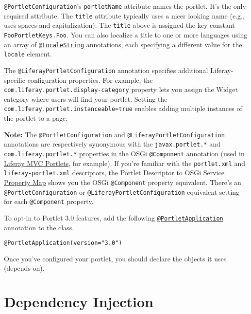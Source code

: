 \texttt{@PortletConfiguration}'s \texttt{portletName} attribute names
the portlet. It's the only required attribute. The \texttt{title}
attribute typically uses a nicer looking name (e.g., uses spaces and
capitalization). The \texttt{title} above is assigned the key constant
\texttt{FooPortletKeys.Foo}. You can also localize a title to one or
more languages using an array of
\href{https://docs.liferay.com/portlet-api/3.0/javadocs/javax/portlet/annotations/LocaleString.html}{\texttt{@LocaleString}}
annotations, each specifying a different value for the \texttt{locale}
element.

The \texttt{@LiferayPortletConfiguration} annotation specifies
additional Liferay-specific configuration properties. For example, the
\texttt{com.liferay.portlet.display-category} property lets you assign
the Widget category where users will find your portlet. Setting the
\texttt{com.liferay.portlet.instanceable=true} enables adding multiple
instances of the portlet to a page.

\noindent\hrulefill

\textbf{Note:} The \texttt{@PortletConfiguration} and
\texttt{@LiferayPortletConfiguration} annotations are respectively
synonymous with the \texttt{javax.portlet.*} and
\texttt{com.liferay.portlet.*} properties in the OSGi
\texttt{@Component} annotation (used in
\href{/docs/7-2/appdev/-/knowledge_base/a/liferay-mvc-portlet}{Liferay
MVC Portlets}, for example). If you're familiar with the
\texttt{portlet.xml} and \texttt{liferay-portlet.xml} descriptors, the
\href{/docs/7-2/reference/-/knowledge_base/r/portlet-descriptor-to-osgi-service-property-map}{Portlet
Descriptor to OSGi Service Property Map} shows you the OSGi
\texttt{@Component} property equivalent. There's an
\texttt{@PortletConfiguration} or \texttt{@LiferayPortletConfiguration}
equivalent setting for each \texttt{@Component} property.

\noindent\hrulefill

To opt-in to Portlet 3.0 features, add the following
\href{https://docs.liferay.com/portlet-api/3.0/javadocs/javax/portlet/annotations/PortletApplication.html}{\texttt{@PortletApplication}}
annotation to the class.

\begin{verbatim}
@PortletApplication(version="3.0")
\end{verbatim}

Once you've configured your portlet, you should declare the objects it
uses (depends on).

\section{Dependency Injection}\label{dependency-injection}

